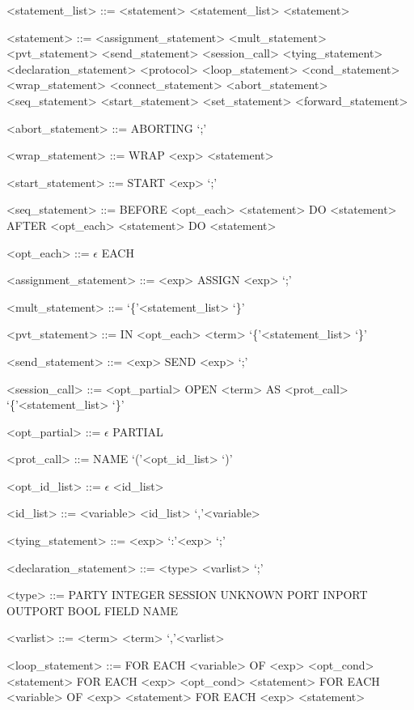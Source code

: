 \begin{grammar}
<statement\_list> ::= <statement> \alt <statement\_list> <statement>

<statement> ::= <assignment\_statement> \alt <mult\_statement> \alt <pvt\_statement> \alt <send\_statement> \alt <session\_call> \alt <tying\_statement> \alt <declaration\_statement> \alt <protocol> \alt <loop\_statement> \alt <cond\_statement> \alt <wrap\_statement> \alt <connect\_statement> \alt <abort\_statement> \alt <seq\_statement> \alt <start\_statement> \alt <set\_statement> \alt <forward\_statement>

<abort\_statement> ::= ABORTING \lq;\rq

<wrap\_statement> ::= WRAP <exp> <statement>

<start\_statement> ::= START <exp> \lq;\rq

<seq\_statement> ::= BEFORE <opt\_each> <statement> DO <statement> \alt AFTER <opt\_each> <statement> DO <statement>

<opt\_each> ::= $\epsilon$ \alt EACH

<assignment\_statement> ::= <exp> ASSIGN <exp> \lq;\rq

<mult\_statement> ::= \lq\{\rq <statement\_list> \lq\}\rq

<pvt\_statement> ::= IN <opt\_each> <term> \lq\{\rq <statement\_list> \lq\}\rq

<send\_statement> ::= <exp> SEND <exp> \lq;\rq

<session\_call> ::= <opt\_partial> OPEN <term> AS <prot\_call> \lq\{\rq <statement\_list> \lq\}\rq

<opt\_partial> ::= $\epsilon$ \alt PARTIAL

<prot\_call> ::= NAME \lq(\rq <opt\_id\_list> \lq)\rq

<opt\_id\_list> ::= $\epsilon$ \alt <id\_list>

<id\_list> ::= <variable> \alt <id\_list> \lq,\rq <variable>

<tying\_statement> ::= <exp> \lq:\rq <exp> \lq;\rq

<declaration\_statement> ::= <type> <varlist> \lq;\rq

<type> ::= PARTY \alt INTEGER \alt SESSION \alt UNKNOWN \alt PORT \alt INPORT \alt OUTPORT \alt BOOL \alt FIELD \alt NAME

<varlist> ::= <term> \alt <term> \lq,\rq <varlist>

<loop\_statement> ::= FOR EACH <variable> OF <exp> <opt\_cond> <statement> \alt FOR EACH <exp> <opt\_cond> <statement> \alt FOR EACH <variable> OF <exp> <statement> \alt FOR EACH <exp> <statement>


\end{grammar}
